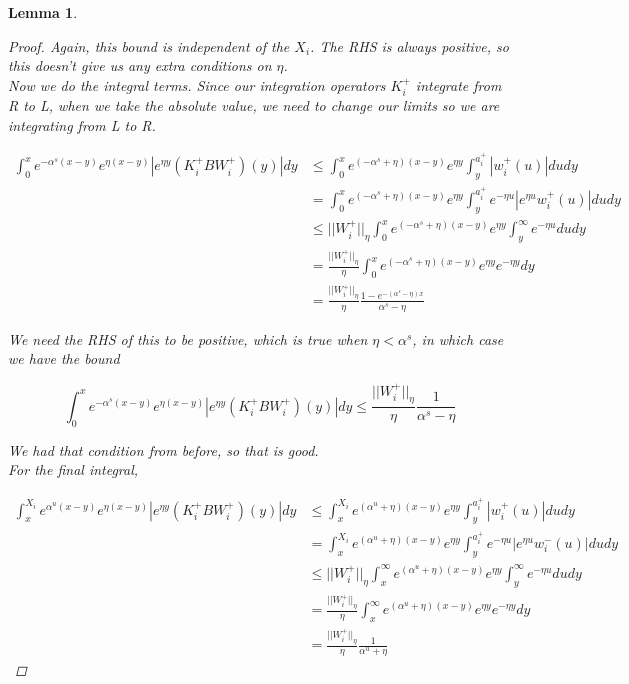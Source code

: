 \documentclass[12pt]{article}
\newtheorem{lemma}{Lemma}
\begin{document}
\begin{lemma}
\begin{proof}
Again, this bound is independent of the $X_i$. The RHS is always positive, so this doesn't give us any extra conditions on $\eta$. \\

Now we do the integral terms. Since our integration operators $K_i^+$ integrate from R to L, when we take the absolute value, we need to change our limits so we are integrating from L to R.

\begin{align*}
\int_0^x e^{-\alpha^s (x-y)}e^{\eta(x-y)}|e^{\eta y} (K_i^+ B W_i^+)(y)| dy &\leq \int_0^x e^{(-\alpha^s + \eta)(x-y)}e^{\eta y} \int_y^{a_i^+} |w_i^+(u)| du dy \\
&= \int_0^x e^{(-\alpha^s + \eta)(x-y)}e^{\eta y} \int_y^{a_i^+} e^{-\eta u} |e^{\eta u} w_i^+(u)| du dy \\
&\leq ||W_i^+||_\eta \int_0^x e^{(-\alpha^s + \eta)(x-y)}e^{\eta y} \int_y^\infty e^{-\eta u} du dy \\
&= \frac{||W_i^+||_\eta}{\eta} \int_0^x e^{(-\alpha^s + \eta)(x-y)}e^{\eta y} e^{-\eta y} dy \\
&= \frac{||W_i^+||_\eta}{\eta} \frac{1 - e^{-(\alpha^s - \eta)x}}{\alpha^s - \eta} 
\end{align*}

We need the RHS of this to be positive, which is true when $\eta < \alpha^s$, in which case we have the bound

\[  
\int_0^x e^{-\alpha^s (x-y)}e^{\eta(x-y)}|e^{\eta y} (K_i^+ B W_i^+)(y)| dy \leq
\frac{||W_i^+||_\eta}{\eta} \frac{1}{\alpha^s - \eta} 
\]

We had that condition from before, so that is good.\\

For the final integral,

\begin{align*}
\int_x^{X_i} e^{\alpha^u (x-y)}e^{\eta(x-y)}|e^{\eta y} (K_i^+ B W_i^+)(y)| dy &\leq \int_x^{X_i} e^{(\alpha^u + \eta)(x-y)}e^{\eta y} \int_y^{a_i^+} |w_i^+(u)| du dy \\
&= \int_x^{X_i} e^{(\alpha^u + \eta)(x-y)}e^{\eta y} \int_y^{a_i^+} e^{-\eta u} |e^{\eta u} w_i^-(u)| du dy \\
&\leq ||W_i^+||_\eta \int_x^\infty e^{(\alpha^u + \eta)(x-y)}e^{\eta y} \int_y^\infty e^{-\eta u} du dy \\
&= \frac{||W_i^+||_\eta}{\eta} \int_x^\infty e^{(\alpha^u + \eta)(x-y)}e^{\eta y} e^{-\eta y} dy \\
&= \frac{||W_i^+||_\eta}{\eta} \frac{1}{\alpha^u + \eta}
\end{align*}


\end{proof}
\end{lemma}
\end{document}
